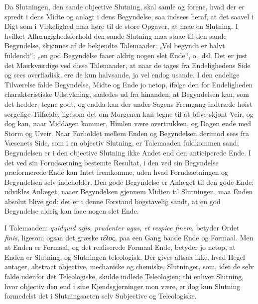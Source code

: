 \documentclass[12pt]{book}
\newcommand{\opage}[1]{\marginnote{\footnotesize\textit{[#1]}}}
\begin{document}
Da Slutningen, den sande objective Slutning, skal samle og forene, hvad der er spredt i dens Midte og anlagt i dens Begyndelse, saa indsees heraf, at det saavel i Digt som i Virkelighed maa høre til de store Opgaver, at naae en Slutning. I hvilket Afhængighedsforhold den sande Slutning maa staae til den sande Begyndelse, skjønnes af de bekjendte Talemaader: „Vel begyndt er halvt fuldendt“; „en god Begyndelse faaer aldrig nogen slet Ende“, o.\ dsl. Det er just det Mærkværdige ved disse Talemaader, at naar de tages fra Endelighedens Side og sees overfladisk, ere de kun halvsande, ja vel endog usande. I den endelige Tilværelse falde Begyndelse, Midte og Ende jo netop, ifølge den for Endeligheden
\opage{396}charakteristiske Udstykning, saaledes ud fra hinanden, at Begyndelsen kan, som det hedder, tegne godt, og endda kan der under Sagens Fremgang indtræde høist sørgelige Tilfælde, ligesom det om Morgenen kan tegne til at blive skjønt Veir, og dog kan, naar Middagen kommer, Himlen være overtrukken, og Dagen ende med Storm og Uveir. Naar Forholdet mellem Enden og Begyndelsen derimod sees fra Væsenets Side, som i en objectiv Slutning, er Talemaaden fuldkommen sand; Begyndelsen er i den objective Slutning ikke Andet end den anticiperede Ende. I det ved sin Forudsætning bestemte Resultat, i den ved sin Begyndelse præformerede Ende kan Intet fremkomme, uden hvad Forudsætningen og Begyndelsen selv indeholder. Den gode Begyndelse er Anlæget til den gode Ende; udvikles Anlæget, naaer Begyndelsen gjennem Midten til Slutningen, maa Enden absolut blive god: det er i denne Forstand bogstavelig sandt, at en god Begyndelse aldrig kan faae nogen slet Ende.

I Talemaaden: \textit{quidquid agis, prudenter agas, et respice finem}, betyder Ordet \textit{finis}, ligesom ogsaa det græske \textit{τέλος}, paa een Gang baade Ende og Formaal. Men at Enden er Formaal, og det realiserede Formaal Ende, betyder jo netop, at Enden er Slutning, og Slutningen teleologisk. Der gives altsaa ikke, hvad Hegel antager, abstract objective, mechaniske og chemiske, Slutninger, som, idet de selv falde udenfor det Teleologiske, skulde indlede Teleologien; thi enhver Slutning, hvor objectiv den end i sine Kjendsgjerninger mon være, er dog kun Slutning formedelst det i Slutningsacten selv Subjective og Teleologiske.
\end{document}
